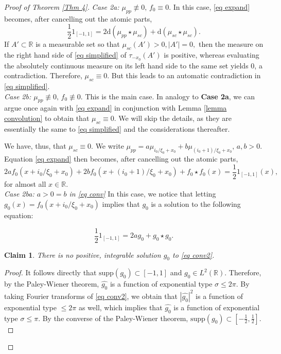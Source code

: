 \documentclass[11pt, reqno]{amsart}
\newcommand{\mmd}{ \mathrm{d}}
\newcommand{\s}{\star}
\numberwithin{equation}{section}
\newtheorem{claim}[theorem]{Claim}
\newcommand{\R}{{\mathbb R}}
\begin{document}
\begin{proof}[Proof of Theorem \ref{Thm 4}]
\noindent\textit{Case 2a: $\mu_{pp} \not\equiv 0, \, f_0 \equiv 0.$} In this case, \eqref{eq expand} becomes, after cancelling out the atomic parts,
\begin{equation}\label{eq simplified}
\frac{1}{2} 1_{[-1,1]} = 2 \mmd (\mu_{pp} \s \mu_{sc}) + \mmd (\mu_{sc} \s \mu_{sc}).
\end{equation}
If $A' \subset \R$ is a measurable set so that $\mu_{sc} (A') > 0, |A'| = 0,$ then the measure on the right hand side of \eqref{eq simplified} of $\tau_{-x_0}(A')$ is positive, whereas evaluating the absolutely continuous
measure on its left hand side to the same set yields 0, a contradiction. Therefore, $\mu_{sc} \equiv 0.$ But this leads to an automatic contradiction in \eqref{eq simplified}. \\

\noindent\textit{Case 2b: $\mu_{pp} \not \equiv 0, \, f_0 \not\equiv 0.$} This is the main case. In analogy to \textbf{Case 2a}, we can argue once again with \eqref{eq expand} in conjunction with Lemma \ref{lemma convolution}
to obtain that $\mu_{sc} \equiv 0.$ We will skip the details, as they are essentially the same to \eqref{eq simplified} and the considerations thereafter. 

We have, thus, that $\mu_{sc} \equiv 0.$ We write $\mu_{pp} = a \mu_{i_0/\xi_0 + x_0} + b \mu_{(i_0 + 1)/\xi_0 + x_0}, \, a,b > 0.$ 
Equation \eqref{eq expand} then becomes, after cancelling out the atomic parts, 
\begin{equation}\label{eq conv}
2a f_0(x + i_0/\xi_0 + x_0) + 2b f_0(x + (i_0+1)/\xi_0 + x_0) + f_0 \s f_0(x) = \frac{1}{2} 1_{[-1,1]}(x),
\end{equation}
for almost all $x \in \R.$ \\

\noindent\textit{Case 2ba: $a > 0 = b$ in \eqref{eq conv}} In this case, we notice that letting $g_0(x) = f_0(x + i_0/\xi_0 + x_0)$ implies that $g_0$ is a solution to the following equation:

\begin{equation}\label{eq conv2} 
\frac{1}{2} 1_{[-1,1]} = 2a g_0  + g_0\s g_0.
\end{equation}

\begin{claim} There is no positive, integrable solution $g_0$ to \eqref{eq conv2}. 
\end{claim}

\begin{proof} It follows directly that $\text{supp}(g_0) \subset [-1,1]$ and $g_0 \in L^2(\R).$ Therefore, by the Paley-Wiener theorem, $\widehat{g_0}$ is a function of exponential type $\sigma \le 2 \pi.$ 
By taking Fourier transforms of \eqref{eq conv2}, we obtain that $|\widehat{g_0}|^2$ is a function of exponential type $\le 2 \pi$ as well, which implies that $\widehat{g_0}$ is a function of exponential 
type $\sigma \le \pi.$ By the converse of the Paley-Wiener theorem, $\text{supp}(g_0) \subset [-\frac{1}{2},\frac{1}{2}].$ 


\end{proof}
\end{proof}
\end{document}
